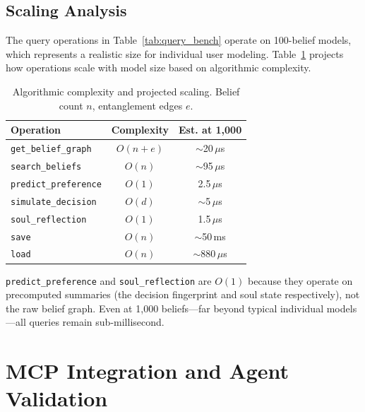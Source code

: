 \documentclass[10pt, twocolumn]{article}
\begin{document}
\subsection{Scaling Analysis}
\label{sec:scaling}

The query operations in Table~\ref{tab:query_bench} operate on 100-belief models, which represents a realistic size for individual user modeling. Table~\ref{tab:scaling} projects how operations scale with model size based on algorithmic complexity.

\begin{table}[t]
\centering
\caption{Algorithmic complexity and projected scaling. Belief count $n$, entanglement edges $e$.}
\label{tab:scaling}
\footnotesize
\begin{tabular}{lcc}
\toprule
\textbf{Operation} & \textbf{Complexity} & \textbf{Est. at 1{,}000} \\
\midrule
\texttt{get\_belief\_graph} & $O(n + e)$ & $\sim$20\,$\mu$s \\
\texttt{search\_beliefs} & $O(n)$ & $\sim$95\,$\mu$s \\
\texttt{predict\_preference} & $O(1)$ & 2.5\,$\mu$s \\
\texttt{simulate\_decision} & $O(d)$ & $\sim$5\,$\mu$s \\
\texttt{soul\_reflection} & $O(1)$ & 1.5\,$\mu$s \\
\texttt{save} & $O(n)$ & $\sim$50\,ms \\
\texttt{load} & $O(n)$ & $\sim$880\,$\mu$s \\
\bottomrule
\end{tabular}
\end{table}

\texttt{predict\_preference} and \texttt{soul\_reflection} are $O(1)$ because they operate on precomputed summaries (the decision fingerprint and soul state respectively), not the raw belief graph. Even at 1{,}000 beliefs---far beyond typical individual models---all queries remain sub-millisecond.


\section{MCP Integration and Agent Validation}
\label{sec:mcp}
\end{document}
